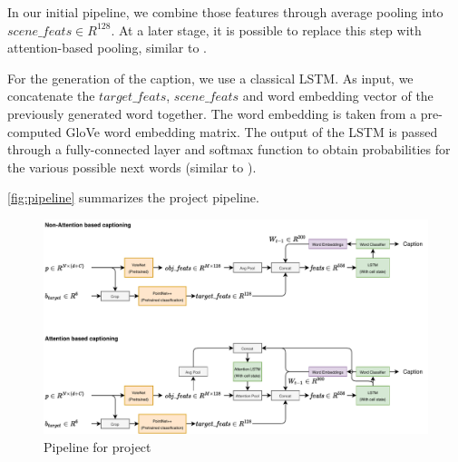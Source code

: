 \documentclass[10pt,twocolumn,letterpaper]{article}
\begin{document}
In our initial pipeline, we combine those features through average pooling into $\mathit{scene\_feats}\in R^{128}$. At a later stage, it is possible to replace this step with attention-based pooling, similar to \cite{Anderson2017}.

For the generation of the caption, we use a classical LSTM. As input, we concatenate the $\mathit{target\_feats}$, $\mathit{scene\_feats}$ and word embedding vector of the previously generated word together. The word embedding is taken from a pre-computed GloVe \cite{pennington2014glove} word embedding matrix. The output of the LSTM is passed through a fully-connected layer and softmax function to obtain probabilities for the various possible next words (similar to \cite{Xu2015}).

\autoref{fig:pipeline} summarizes the project pipeline.

\begin{figure}
	\centering
	\includegraphics[width=\textwidth]{figures/pipeline_sketch.pdf}
	\caption{Pipeline for project}
	\label{fig:pipeline}
\end{figure}

{\small


}
\end{document}
